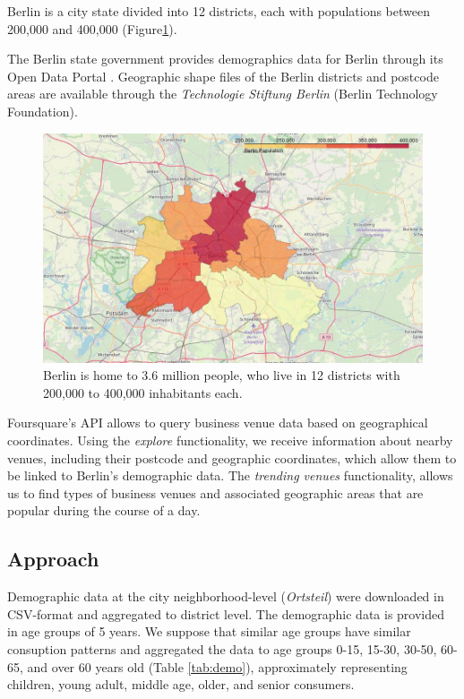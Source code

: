 \documentclass[letter]{scrartcl}
\begin{document}
Berlin is a city state divided into 12 districts, each with populations between 200,000 and 400,000 (Figure\ref{fig:Berlin}).  

The Berlin state government provides demographics data for Berlin through its Open Data Portal \cite{Dem}. Geographic shape files of the Berlin districts \cite{Bez} and postcode \cite{PLZ} areas are available through the \emph{Technologie Stiftung Berlin} (Berlin Technology Foundation). 

\begin{figure}[h]
\centering
\includegraphics[width=12cm]{../Figures/Berlin_Pop.JPG}
\caption{Berlin is home to 3.6 million people, who live in 12 districts with 200,000 to 400,000 inhabitants each.}\label{fig:Berlin}
\end{figure}

Foursquare's API \cite{FS} allows to query business venue data based on geographical coordinates. Using the \emph{explore} functionality, we receive information about nearby venues, including their postcode and geographic coordinates, which allow them to be linked to Berlin's demographic data. The \emph{trending venues} functionality, allows us to find types of business venues and associated geographic areas that are popular during the course of a day. 

\subsection{Approach}

Demographic data at the city neighborhood-level (\emph{Ortsteil}) were downloaded in CSV-format and aggregated to district level. The demographic data is provided in age groups of 5 years. We suppose that similar age groups have similar consuption patterns and aggregated the data to age groups 0-15, 15-30, 30-50, 60-65, and over 60 years old (Table \ref{tab:demo}), approximately representing children, young adult, middle age, older, and senior consumers. 
\end{document}
